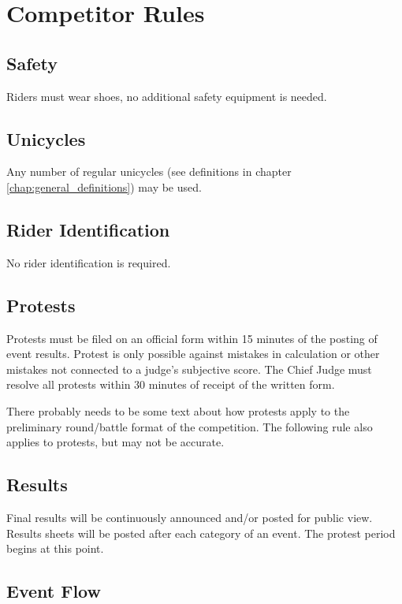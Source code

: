 \chapter{Competitor Rules}

\section{Safety}

Riders must wear shoes, no additional safety equipment is needed.

\section{Unicycles}

Any number of regular unicycles (see definitions in chapter \ref{chap:general_definitions}) may be used.

\section{Rider Identification}

No rider identification is required.

\section{Protests}

Protests must be filed on an official form within 15 minutes of the posting of event results.
Protest is only possible against mistakes in calculation or other mistakes not connected to a judge's subjective score.
The Chief Judge must resolve all protests within 30 minutes of receipt of the written form.

\begin{comment2016}
There probably needs to be some text about how protests apply to the preliminary round/battle format of the competition.
The following rule also applies to protests, but may not be accurate.
\end{comment2016}

\section{Results}
Final results will be continuously announced and/or posted for public view.
Results sheets will be posted after each category of an event.
The protest period begins at this point.

\section{Event Flow}

